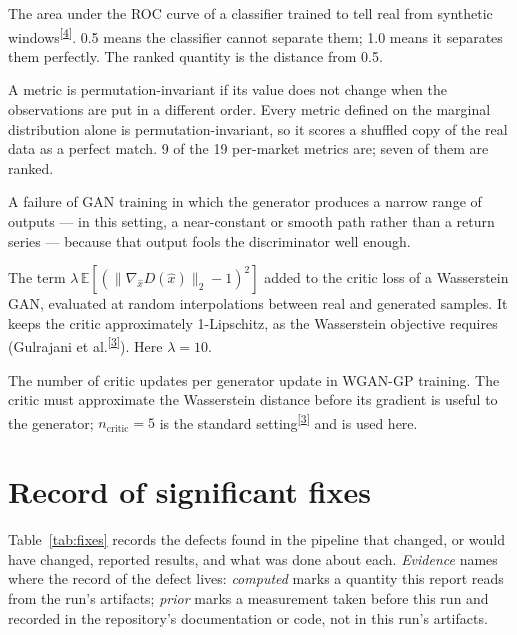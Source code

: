 \documentclass[11pt,a4paper]{article}
\makeatletter
\newcommand{\tcite}[1]{\textsuperscript{[\hyperlink{R:#1}{#1}]}}
\DeclareRobustCommand{\_}{\ifmmode\nfss@text{\textunderscore}\else\textunderscore\allowbreak\fi}
\newcommand{\E}{\mathbb{E}}
\makeatother
\begin{document}
\begin{description}[style=nextline,leftmargin=1.4em,itemsep=4pt,font=\sffamily\bfseries]
\item[Discriminative AUC] The area under the ROC curve of a classifier trained to tell real from synthetic windows\tcite{4}. 0.5 means the classifier cannot separate them; 1.0 means it separates them perfectly. The ranked quantity is the distance from 0.5.
\item[Permutation invariance] A metric is permutation-invariant if its value does not change when the observations are put in a different order. Every metric defined on the marginal distribution alone is permutation-invariant, so it scores a shuffled copy of the real data as a perfect match. 9 of the 19 per-market metrics are; seven of them are ranked.
\item[Mode collapse] A failure of GAN training in which the generator produces a narrow range of outputs --- in this setting, a near-constant or smooth path rather than a return series --- because that output fools the discriminator well enough.
\item[Gradient penalty] The term $\lambda\,\E[(\|\nabla_{\hat x}D(\hat x)\|_2-1)^2]$ added to the critic loss of a Wasserstein GAN, evaluated at random interpolations between real and generated samples. It keeps the critic approximately 1-Lipschitz, as the Wasserstein objective requires (Gulrajani et al.\tcite{3}). Here $\lambda=10$.
\item[$n_\text{critic}$] The number of critic updates per generator update in WGAN-GP training. The critic must approximate the Wasserstein distance before its gradient is useful to the generator; $n_\text{critic}=5$ is the standard setting\tcite{3} and is used here.
\end{description}

\clearpage
\appendix
\renewcommand{\thesection}{\Alph{section}}

\section{Record of significant fixes}
\label{app:fixes}
Table~\ref{tab:fixes} records the defects found in the pipeline that changed, or would have changed, reported results, and what was done about each. \emph{Evidence} names where the record of the defect lives: \emph{computed} marks a quantity this report reads from the run's artifacts; \emph{prior} marks a measurement taken before this run and recorded in the repository's documentation or code, not in this run's artifacts.
\end{document}
